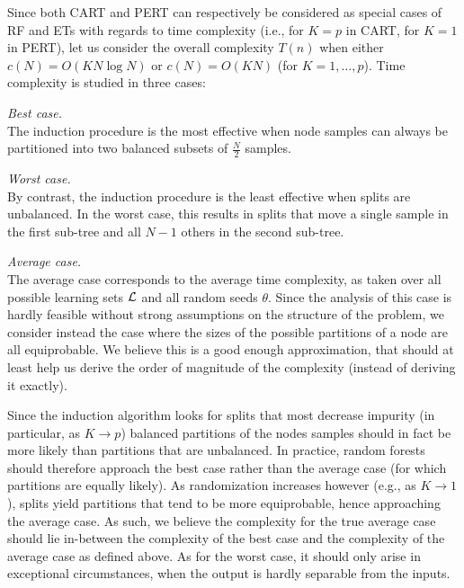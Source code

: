 Since both CART and PERT can respectively be considered as special cases of RF
and ETs with regards to time complexity (i.e., for $K=p$ in CART, for $K=1$ in
PERT), let us consider the overall complexity $T(n)$ when either
$c(N)=O(KN\log N)$ or $c(N)=O(KN)$ (for $K=1,\dots,p$). Time complexity
is studied in three cases:

\begin{description}
\item \textit{Best case.}\hfill\\
      The induction procedure is the most effective
      when node samples can always be partitioned into two balanced subsets of $\tfrac{N}{2}$
      samples.

\item \textit{Worst case.}\hfill\\
      By contrast, the induction procedure is the least
      effective when splits are unbalanced. In the worst case,
      this results in splits that move a single sample in the first sub-tree and
      all $N-1$ others in the second sub-tree.

\item \textit{Average case.}\hfill\\
      The average case corresponds to the average time
      complexity, as taken over all possible learning sets ${\cal L}$ and
      all random seeds $\theta$.  Since the analysis of this case is hardly
      feasible without strong assumptions on the structure of the problem,
      we consider instead the case where the sizes of the possible
      partitions of a node are all equiprobable. We believe this is a good
      enough approximation, that should at least help us derive the order
      of magnitude of the complexity (instead of deriving it exactly).

\end{description}

Since the induction algorithm looks for splits that most decrease impurity (in
particular, as $K\to p$) balanced partitions of the nodes samples should in
fact be more likely than partitions that are unbalanced. In practice, random
forests should therefore approach the best case rather than the average case
(for which partitions are equally likely). As randomization increases however
(e.g., as $K \to 1$), splits yield partitions that tend to be more
equiprobable, hence approaching the average case. As such, we believe the
complexity for the true average case should lie in-between the complexity of
the best case and the complexity of the average case as defined above. As for
the worst case, it should only arise in exceptional circumstances, when the
output is hardly separable from the inputs.

